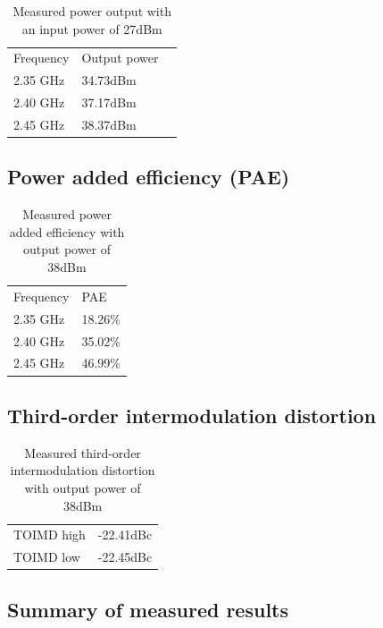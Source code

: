   \begin{table}[H]
	  \centering
	  \begin{tabular}{l l l}
		  Frequency & Output power\\
		  2.35 GHz & 34.73dBm \\
		  2.40 GHz & 37.17dBm \\
		  2.45 GHz & 38.37dBm
	  \end{tabular}
	  \caption{Measured power output with an input power of 27dBm}
	  \label{tab:Meas_Pout}
  \end{table}

  \subsection{Power added efficiency (PAE)}


  \begin{table}[H]
	  \centering
	  \begin{tabular}{l l}
		  Frequency & PAE \\
		  2.35 GHz & 18.26\% \\
		  2.40 GHz & 35.02\% \\
		  2.45 GHz & 46.99\%
	  \end{tabular}
	  \caption{Measured power added efficiency with output power of 38dBm}
	  \label{tab:Meas_Pae}
  \end{table}

  \subsection{Third-order intermodulation distortion}

    \begin{table}[H]
	  \centering
	  \begin{tabular}{l l}
		  TOIMD high & -22.41dBc \\
		  TOIMD low & -22.45dBc
	  \end{tabular}
	  \caption{Measured third-order intermodulation distortion with output power of 38dBm}
	  \label{tab:Meas_Toimd}
  \end{table}

  \subsection{Summary of measured results}

